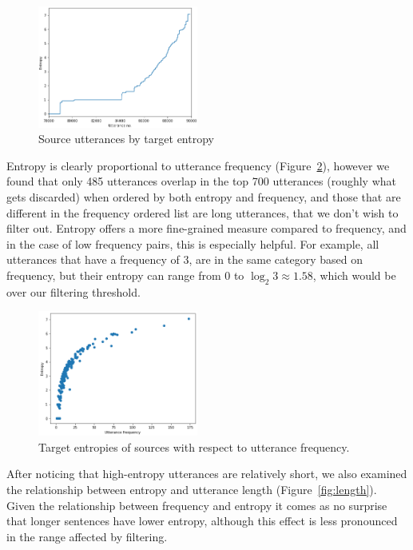 \documentclass[11pt,a4paper]{article}
\begin{document}
\begin{figure}[!ht]
	\centering
	\includegraphics[width=0.47\textwidth]{pics/source_entropies.png}
	\caption{Source utterances by target entropy}
	\label{fig:entropies}
\end{figure}

Entropy is clearly proportional to utterance frequency
(Figure~\ref{fig:frequencies}), however we found that only 485 utterances overlap in the top 700 utterances (roughly what gets discarded) when ordered by both entropy and frequency, and those that are different in the frequency ordered list are long utterances, that we don't wish to filter out. Entropy offers a more fine-grained measure compared to frequency, and in the case of low frequency pairs, this is especially helpful. For example, all utterances that have a frequency of 3, are in the same category based on frequency, but their entropy can range from 0 to $\log_2 3\approx1.58$, which would be over our filtering threshold.



\begin{figure}[!ht]
	\centering
	\includegraphics[width=0.47\textwidth]{pics/source_entropies_frequency.png}
	\caption{Target entropies of sources with respect to utterance frequency.}
	\label{fig:frequencies}
\end{figure}

After noticing that high-entropy utterances are relatively short, we
also examined the relationship between entropy and utterance length
(Figure~\ref{fig:length}). Given the relationship between frequency and
entropy it comes as no surprise that longer sentences have lower entropy,
although this effect is less pronounced in the range affected by filtering.
\end{document}
